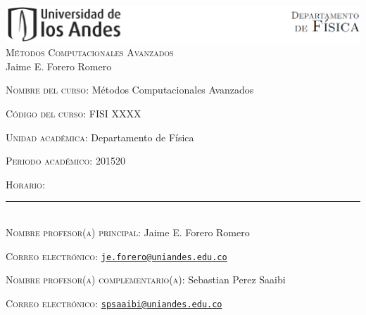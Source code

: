 \documentclass[letterpaper,10pt,onecolumn]{article}
\begin{document}
\begin{center}

\includegraphics[width=490pt]{header.png}\\[0.5cm]

\textsc{\LARGE M\'etodos Computacionales Avanzados}\\[0.1cm]

\large Jaime E. Forero Romero\\[0.5cm]

\end{center}

\large \noindent\textsc{Nombre del curso:}  M\'etodos Computacionales Avanzados%
  
\noindent\textsc{C\'odigo del curso:} FISI XXXX %

\noindent\textsc{Unidad acad\'emica:} Departamento de F\'isica

\noindent\textsc{Periodo acad\'emico:} 201520 %

\noindent\textsc{Horario:} %

\noindent\rule{\textwidth}{1pt}\\[-0.3cm]

\normalsize \noindent\textsc{Nombre profesor(a) principal:} Jaime
E. Forero Romero%

\noindent\textsc{Correo electr\'onico:}
\href{mailto:je.forero@uniandes.edu.co}{\nolinkurl{je.forero@uniandes.edu.co}}


\noindent\textsc{Nombre profesor(a) complementario(a):} Sebastian Perez Saaibi %

\noindent\textsc{Correo electr\'onico:}
\href{mailto:spsaaibi@uniandes.edu.co}{\nolinkurl{spsaaibi@uniandes.edu.co}}
\end{document}
